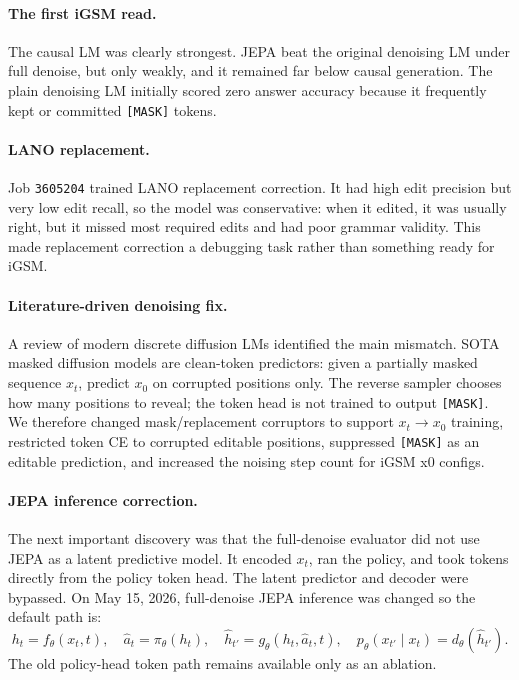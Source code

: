 \documentclass[11pt]{article}
\begin{document}
\paragraph{The first iGSM read.}
The causal LM was clearly strongest.  JEPA beat the original denoising LM under
full denoise, but only weakly, and it remained far below causal generation.  The
plain denoising LM initially scored zero answer accuracy because it frequently
kept or committed \texttt{[MASK]} tokens.

\paragraph{LANO replacement.}
Job \texttt{3605204} trained LANO replacement correction.  It had high edit
precision but very low edit recall, so the model was conservative: when it
edited, it was usually right, but it missed most required edits and had poor
grammar validity.  This made replacement correction a debugging task rather than
something ready for iGSM.

\paragraph{Literature-driven denoising fix.}
A review of modern discrete diffusion LMs identified the main mismatch.  SOTA
masked diffusion models are clean-token predictors: given a partially masked
sequence $x_t$, predict $x_0$ on corrupted positions only.  The reverse sampler
chooses how many positions to reveal; the token head is not trained to output
\texttt{[MASK]}.  We therefore changed mask/replacement corruptors to support
$x_t \rightarrow x_0$ training, restricted token CE to corrupted editable
positions, suppressed \texttt{[MASK]} as an editable prediction, and increased
the noising step count for iGSM x0 configs.

\paragraph{JEPA inference correction.}
The next important discovery was that the full-denoise evaluator did not use
JEPA as a latent predictive model.  It encoded $x_t$, ran the policy, and took
tokens directly from the policy token head.  The latent predictor and decoder
were bypassed.  On May 15, 2026, full-denoise JEPA inference was changed so the
default path is:
\[
  h_t = f_\theta(x_t,t), \quad
  \hat{a}_t = \pi_\theta(h_t), \quad
  \hat{h}_{t'} = g_\theta(h_t,\hat{a}_t,t), \quad
  p_\theta(x_{t'} \mid x_t) = d_\theta(\hat{h}_{t'}).
\]
The old policy-head token path remains available only as an ablation.
\end{document}
